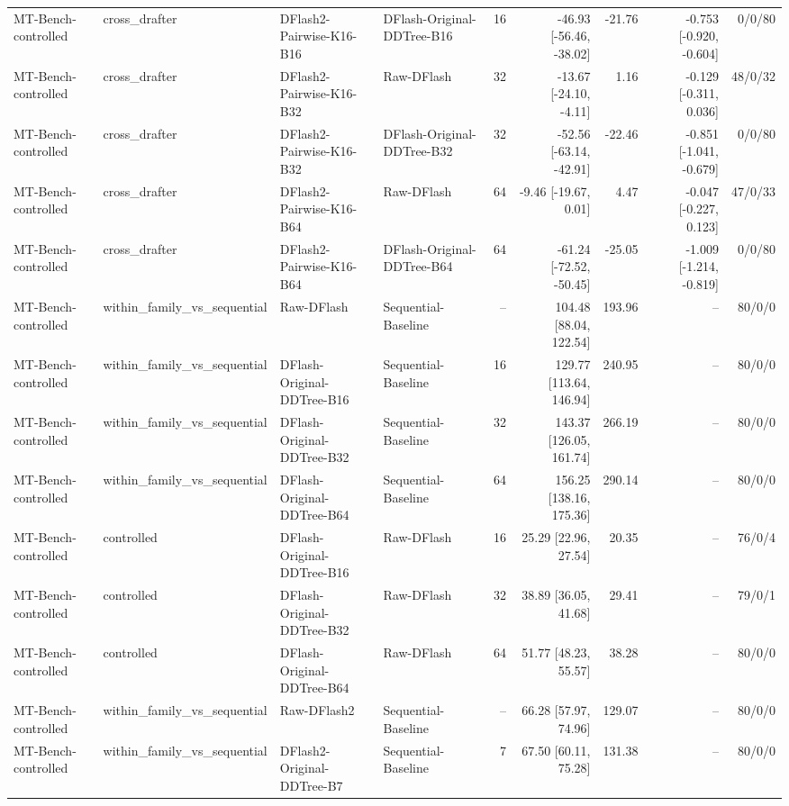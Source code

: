 \begin{longtable}{llllrrrrr}
MT-Bench-controlled & cross\_drafter & DFlash2-Pairwise-K16-B16 & DFlash-Original-DDTree-B16 & 16 & -46.93 [-56.46, -38.02] & -21.76 & -0.753 [-0.920, -0.604] & 0/0/80 \\
MT-Bench-controlled & cross\_drafter & DFlash2-Pairwise-K16-B32 & Raw-DFlash & 32 & -13.67 [-24.10, -4.11] & 1.16 & -0.129 [-0.311, 0.036] & 48/0/32 \\
MT-Bench-controlled & cross\_drafter & DFlash2-Pairwise-K16-B32 & DFlash-Original-DDTree-B32 & 32 & -52.56 [-63.14, -42.91] & -22.46 & -0.851 [-1.041, -0.679] & 0/0/80 \\
MT-Bench-controlled & cross\_drafter & DFlash2-Pairwise-K16-B64 & Raw-DFlash & 64 & -9.46 [-19.67, 0.01] & 4.47 & -0.047 [-0.227, 0.123] & 47/0/33 \\
MT-Bench-controlled & cross\_drafter & DFlash2-Pairwise-K16-B64 & DFlash-Original-DDTree-B64 & 64 & -61.24 [-72.52, -50.45] & -25.05 & -1.009 [-1.214, -0.819] & 0/0/80 \\
MT-Bench-controlled & within\_family\_vs\_sequential & Raw-DFlash & Sequential-Baseline & -- & 104.48 [88.04, 122.54] & 193.96 & -- & 80/0/0 \\
MT-Bench-controlled & within\_family\_vs\_sequential & DFlash-Original-DDTree-B16 & Sequential-Baseline & 16 & 129.77 [113.64, 146.94] & 240.95 & -- & 80/0/0 \\
MT-Bench-controlled & within\_family\_vs\_sequential & DFlash-Original-DDTree-B32 & Sequential-Baseline & 32 & 143.37 [126.05, 161.74] & 266.19 & -- & 80/0/0 \\
MT-Bench-controlled & within\_family\_vs\_sequential & DFlash-Original-DDTree-B64 & Sequential-Baseline & 64 & 156.25 [138.16, 175.36] & 290.14 & -- & 80/0/0 \\
MT-Bench-controlled & controlled & DFlash-Original-DDTree-B16 & Raw-DFlash & 16 & 25.29 [22.96, 27.54] & 20.35 & -- & 76/0/4 \\
MT-Bench-controlled & controlled & DFlash-Original-DDTree-B32 & Raw-DFlash & 32 & 38.89 [36.05, 41.68] & 29.41 & -- & 79/0/1 \\
MT-Bench-controlled & controlled & DFlash-Original-DDTree-B64 & Raw-DFlash & 64 & 51.77 [48.23, 55.57] & 38.28 & -- & 80/0/0 \\
MT-Bench-controlled & within\_family\_vs\_sequential & Raw-DFlash2 & Sequential-Baseline & -- & 66.28 [57.97, 74.96] & 129.07 & -- & 80/0/0 \\
MT-Bench-controlled & within\_family\_vs\_sequential & DFlash2-Original-DDTree-B7 & Sequential-Baseline & 7 & 67.50 [60.11, 75.28] & 131.38 & -- & 80/0/0 \\

\end{longtable}
